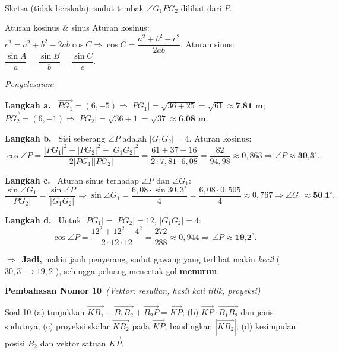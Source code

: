 \documentclass[11pt,a4paper]{article}
\newcommand{\jawab}{\par\smallskip\noindent\textit{\textcolor{oranye}{Penyelesaian:}}\par\smallskip}
\newcommand{\langkah}[1]{\par\smallskip\noindent\textbf{\textcolor{biru}{Langkah #1.}}\ }
\newcommand{\jadi}{\par\smallskip\noindent$\Rightarrow$\ \textbf{Jadi, }}
\newcommand{\nomorjudul}[2]{\par\bigskip\noindent%
  {\large\bfseries\color{ungu}Pembahasan Nomor #1}\ {\normalfont\itshape\color{gray}(#2)}\par\nopagebreak\smallskip}
\begin{document}
\begin{center}
\\
{\small Sketsa (tidak berskala): sudut tembak $\angle G_1PG_2$ dilihat dari $P$.}
\end{center}

\begin{ingat}{Aturan kosinus \& sinus}
Aturan kosinus: $c^2=a^2+b^2-2ab\cos C \Rightarrow \cos C=\dfrac{a^2+b^2-c^2}{2ab}$.
Aturan sinus: $\dfrac{\sin A}{a}=\dfrac{\sin B}{b}=\dfrac{\sin C}{c}$.
\end{ingat}

\jawab
\langkah{a} $\vec{PG_1}=(6,-5)\Rightarrow|PG_1|=\sqrt{36+25}=\sqrt{61}\approx\textbf{7{,}81 m}$;\quad
$\vec{PG_2}=(6,-1)\Rightarrow|PG_2|=\sqrt{36+1}=\sqrt{37}\approx\textbf{6{,}08 m}$.

\langkah{b} Sisi seberang $\angle P$ adalah $|G_1G_2|=4$. Aturan kosinus:
\[
\cos\angle P=\frac{|PG_1|^2+|PG_2|^2-|G_1G_2|^2}{2|PG_1||PG_2|}
 =\frac{61+37-16}{2\cdot7{,}81\cdot6{,}08}=\frac{82}{94{,}98}\approx0{,}863
 \Rightarrow \angle P\approx\textbf{30{,}3}^\circ.
\]

\langkah{c} Aturan sinus terhadap $\angle P$ dan $\angle G_1$:
\[
\frac{\sin\angle G_1}{|PG_2|}=\frac{\sin\angle P}{|G_1G_2|}
\Rightarrow \sin\angle G_1=\frac{6{,}08\cdot\sin30{,}3^\circ}{4}
=\frac{6{,}08\cdot0{,}505}{4}\approx0{,}767
\Rightarrow \angle G_1\approx\textbf{50{,}1}^\circ.
\]

\langkah{d} Untuk $|PG_1|=|PG_2|=12$, $|G_1G_2|=4$:
\[
\cos\angle P=\frac{12^2+12^2-4^2}{2\cdot12\cdot12}=\frac{272}{288}\approx0{,}944
\Rightarrow \angle P\approx\textbf{19{,}2}^\circ.
\]
\jadi makin jauh penyerang, sudut gawang yang terlihat makin \emph{kecil}
($30{,}3^\circ\to19{,}2^\circ$), sehingga peluang mencetak gol \textbf{menurun}.

\nomorjudul{10}{Vektor: resultan, hasil kali titik, proyeksi}
\begin{soalbox}{Soal 10}
(a) tunjukkan $\vec{KB_1}+\vec{B_1B_2}+\vec{B_2P}=\vec{KP}$;
(b) $\vec{KP}\cdot\vec{B_1B_2}$ dan jenis sudutnya;
(c) proyeksi skalar $\vec{KB_2}$ pada $\vec{KP}$, bandingkan $|\vec{KB_2}|$;
(d) kesimpulan posisi $B_2$ dan vektor satuan $\vec{KP}$.
\end{soalbox}
\end{document}
